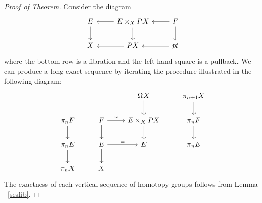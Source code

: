 \documentclass{article}
\newtheorem{proposed work}[theorem]{Proposed Work}
\theoremstyle{definition}
\begin{document}
\begin{proof}[Proof of Theorem]
Consider the diagram
\[
\begin{tikzcd}
E \arrow[d] & E \times_X PX \arrow[l] \arrow[d] & F \arrow[l] \arrow[d] \\
X  & PX \arrow[l] & pt \arrow[l]
\end{tikzcd}
\]
where the bottom row is a fibration and the left-hand square is a pullback. We can  produce a long exact sequence by iterating the procedure illustrated in the following diagram:
\[
\begin{tikzcd}
& & \Omega X  \arrow[d] & \pi_{n+1}X \arrow[d] \\
\pi_n F \arrow[d]  & F \arrow[d] \arrow[r,"\simeq"] & E \times_X PX \arrow{d} & \pi_n F \arrow[d] \\
\pi_n E \arrow[d] & E  \arrow[d] \arrow[r,"="]& E & \pi_n E \\
\pi_n X & X
\end{tikzcd}
\]
The exactness of each vertical sequence of homotopy groups follows from Lemma ~\ref{sesfib}. 
\end{proof}
\end{document}
